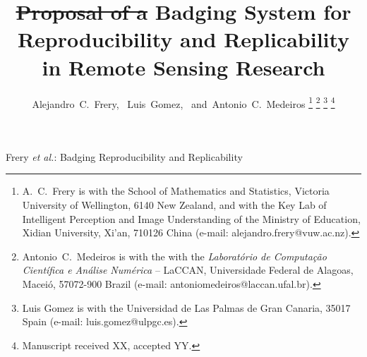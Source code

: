 \documentclass[journal,twoside]{IEEEtran}
\providecommand{\DIFadd}[1]{{\protect\color{blue}\uwave{#1}}} %
\providecommand{\DIFdel}[1]{{\protect\color{red}\sout{#1}}}                      %
\providecommand{\DIFaddbegin}{} %
\providecommand{\DIFaddend}{} %
\providecommand{\DIFdelbegin}{} %
\providecommand{\DIFdelend}{} %
\newcommand{\DIFscaledelfig}{0.5}
\newlength{\DIFdelgraphicswidth} %
\newlength{\DIFdelgraphicsheight} %
\newcommand{\DIFaddincludegraphics}[2][]{{\color{blue}\fbox{\DIFOincludegraphics[#1]{#2}}}} %
\newcommand{\DIFdelincludegraphics}[2][]{%
\sbox{\DIFdelgraphicsbox}{\DIFOincludegraphics[#1]{#2}}%
\settoboxwidth{\DIFdelgraphicswidth}{\DIFdelgraphicsbox} %
\settoboxtotalheight{\DIFdelgraphicsheight}{\DIFdelgraphicsbox} %
\scalebox{\DIFscaledelfig}{%
\parbox[b]{\DIFdelgraphicswidth}{\usebox{\DIFdelgraphicsbox}\\[-\baselineskip] \rule{\DIFdelgraphicswidth}{0em}}\llap{\resizebox{\DIFdelgraphicswidth}{\DIFdelgraphicsheight}{%
\setlength{\unitlength}{\DIFdelgraphicswidth}%
\begin{picture}(1,1)%
\thicklines\linethickness{2pt} %
{\color[rgb]{1,0,0}\put(0,0){\framebox(1,1){}}}%
{\color[rgb]{1,0,0}\put(0,0){\line( 1,1){1}}}%
{\color[rgb]{1,0,0}\put(0,1){\line(1,-1){1}}}%
\end{picture}%
}\hspace*{3pt}}} %
} %
\DeclareRobustCommand{\DIFaddbegin}{\DIFOaddbegin \let\includegraphics\DIFaddincludegraphics} %
\DeclareRobustCommand{\DIFaddend}{\DIFOaddend \let\includegraphics\DIFOincludegraphics} %
\DeclareRobustCommand{\DIFdelbegin}{\DIFOdelbegin \let\includegraphics\DIFdelincludegraphics} %
\DeclareRobustCommand{\DIFdelend}{\DIFOaddend \let\includegraphics\DIFOincludegraphics} %
\begin{document}
\title{\DIFdelbegin \DIFdel{Proposal of a }\DIFdelend \DIFaddbegin \DIFadd{A }\DIFaddend Badging System for Reproducibility and Replicability in Remote Sensing Research}

\author{Alejandro~C.~Frery,~
	Luis~Gomez,~
	and~Antonio~C.~Medeiros%
	\DIFdelbegin %
\DIFdelend \DIFaddbegin \thanks{A.\ C.\ Frery is with the School of Mathematics and Statistics, Victoria University of Wellington, 6140 New Zealand, and with the Key Lab of Intelligent Perception and Image Understanding of the Ministry of Education, Xidian University, Xi'an, 710126 China (e-mail: alejandro.frery@vuw.ac.nz).}\DIFaddend %
	\DIFdelbegin %
\DIFdelend \DIFaddbegin \thanks{Antonio~C.~Medeiros is with the with the \textit{Laborat\'orio de Computa\c c\~ao Cient\'ifica e An\'alise Num\'erica} -- LaCCAN, Universidade Federal de Alagoas, Macei\'o, 57072-900 Brazil (e-mail: antoniomedeiros@laccan.ufal.br).}\DIFaddend %
	\DIFaddbegin \thanks{Luis Gomez is with the Universidad de Las Palmas de Gran Canaria, 35017 Spain (e-mail: luis.gomez@ulpgc.es).}%
	\DIFaddend \thanks{Manuscript received XX, accepted YY.}}

%
{Frery \MakeLowercase{\textit{et al.}}: Badging Reproducibility and Replicability}
\end{document}
